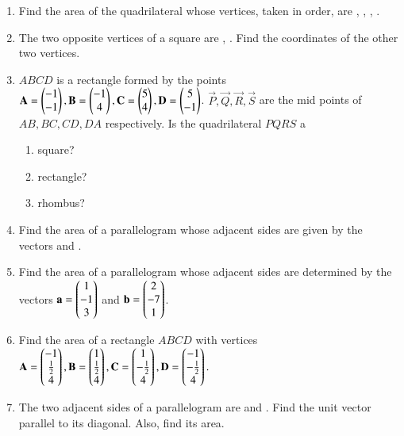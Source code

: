 \begin{enumerate}[label=\arabic*.,ref=\thesubsection.\theenumi]
\item  Find the area of the quadrilateral whose vertices, taken in order, are 
 ,  ,  ,  . 
\item The two opposite vertices of a square are ,  . Find the coordinates of the other two vertices.
\item $ABCD$ is a rectangle formed by the points $\mathbf{A} = \begin{pmatrix}-1\\-1\end{pmatrix}, \mathbf{B} = \begin{pmatrix}-1\\4\end{pmatrix}, \mathbf{C} = \begin{pmatrix}5\\4\end{pmatrix}, \mathbf{D} = \begin{pmatrix}5\\-1\end{pmatrix}$. $ \vec{P}, \vec{Q}, \vec{R}, \vec{S}$ are the mid points of $AB, BC, CD, DA$ respectively.  Is the quadrilateral $PQRS$ a 
\begin{enumerate}
\item square?
\item rectangle?
\item rhombus?
\end{enumerate}
\item Find the area of a parallelogram whose adjacent sides are given by the vectors  and .
\item Find the area of a parallelogram whose adjacent sides are determined by the vectors $\mathbf{a} = \begin{pmatrix}1\\-1\\3\end{pmatrix}$ and $\mathbf{b}=\begin{pmatrix}2\\-7\\1\end{pmatrix}$.
\item Find the area of a rectangle $ABCD$ with vertices
$\mathbf{A} = \begin{pmatrix}-1\\\frac{1}{2}\\ 4\end{pmatrix},
 \mathbf{B} = \begin{pmatrix}1\\\frac{1}{2}\\ 4\end{pmatrix},
\mathbf{C} = \begin{pmatrix}1\\-\frac{1}{2}\\ 4\end{pmatrix},
\mathbf{D} = \begin{pmatrix}-1\\-\frac{1}{2}\\ 4\end{pmatrix}.
$
\item The two adjacent sides of a parallelogram are  and  . Find the unit vector parallel to its diagonal.  Also, find its area.
\end{enumerate}
%
